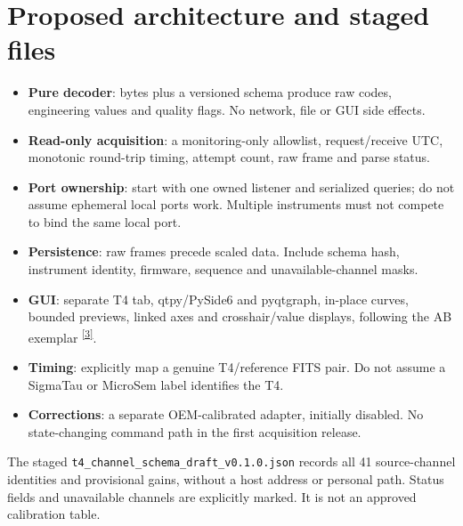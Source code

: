 \documentclass[11pt,a4paper]{article}
\newcommand{\repocite}{\textsuperscript{\href{https://github.com/Braveheart53/GBO_Maser_Control/tree/main}{[3]}}}
\begin{document}
\section{Proposed architecture and staged files}
\begin{itemize}
\item \textbf{Pure decoder}: bytes plus a versioned schema produce raw codes,
engineering values and quality flags. No network, file or GUI side effects.
\item \textbf{Read-only acquisition}: a monitoring-only allowlist, request/receive
UTC, monotonic round-trip timing, attempt count, raw frame and parse status.
\item \textbf{Port ownership}: start with one owned listener and serialized
queries; do not assume ephemeral local ports work. Multiple instruments must
not compete to bind the same local port.
\item \textbf{Persistence}: raw frames precede scaled data. Include schema hash,
instrument identity, firmware, sequence and unavailable-channel masks.
\item \textbf{GUI}: separate T4 tab, qtpy/PySide6 and pyqtgraph, in-place curves,
bounded previews, linked axes and crosshair/value displays, following the
AB exemplar \repocite.
\item \textbf{Timing}: explicitly map a genuine T4/reference FITS pair. Do not
assume a SigmaTau or MicroSem label identifies the T4.
\item \textbf{Corrections}: a separate OEM-calibrated adapter, initially disabled.
No state-changing command path in the first acquisition release.
\end{itemize}

The staged \texttt{t4\_channel\_schema\_draft\_v0.1.0.json} records all 41
source-channel identities and provisional gains, without a host address or
personal path. Status fields and unavailable channels are explicitly marked.
It is not an approved calibration table.
\end{document}
